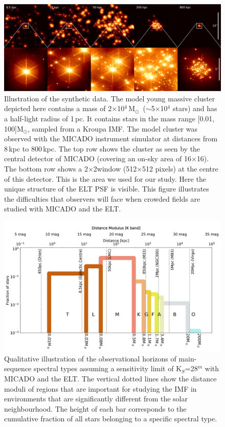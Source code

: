 \documentclass[referee]{aa}
\newcommand{\msun}{M$_\odot$~}
\newcommand{\msune}{M$_\odot$}
\begin{document}
\begin{figure}
    \centering
    \includegraphics[width=\textwidth]{5_clusters.pdf}
    \caption{Illustration of the synthetic data.
    The model young massive cluster depicted here contains a mass of 2$\times$10$^4$\,\msun ($\sim$5$\times$10$^4$ stars) and has a half-light radius of 1\,pc.
    It contains stars in the mass range [0.01, 100]\msune, sampled from a Kroupa IMF.
    The model cluster was observed with the MICADO instrument simulator at distances from 8\,kpc to 800\,kpc.
    The top row shows the cluster as seen by the central detector of MICADO (covering an on-sky area of 16\arcsec$\times$16\arcsec).
    The bottom row shows a 2\arcsec$\times$2\arcsec window (512$\times$512 pixels) at the centre of this detector.
    This is the area we used for our study.
    Here the unique structure of the ELT PSF is visible.
    This figure illustrates the difficulties that observers will face when crowded fields are studied with MICADO and the ELT.
    }
    \label{fig:5_clusters}
\end{figure}


\begin{figure}
    \centering
    \includegraphics[width=\textwidth]{imf_educational.pdf}
    \caption{Qualitative illustration of the observational horizons of main-sequence spectral types assuming a sensitivity limit of K$_S$=28$^m$ with MICADO and the ELT.
    The vertical dotted lines show the distance moduli of regions that are important for studying the IMF in environments that are significantly different from the solar neighbourhood.
    The height of each bar corresponds to the cumulative fraction of all stars belonging to a specific spectral type.
    }
    \label{fig:imf_educational}
\end{figure}
\end{document}
